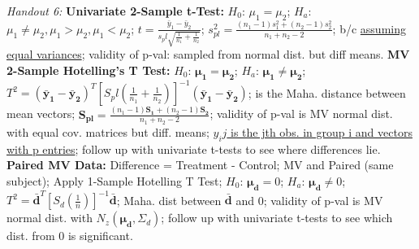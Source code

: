 \documentclass[9pt]{extarticle}
\begin{document}
\textit{Handout 6:}
\textbf{Univariate 2-Sample t-Test:} $H_0$: $\mu_1 = \mu_2$; $H_a$: $\mu_1 
\neq \mu_2, \mu_1 > \mu_2, \mu_1 < \mu_2$; $t = \frac{\bar{y}_1 - \bar{y}_2}
{s_pl\sqrt{\frac{1}{n_1} + \frac{1}{n_2}}}$; $s_{pl}^2 = \frac{(n_1 - 1)s_1^2
+ (n_2 - 1)s_2^2}{n_1 + n_2 - 2}$; b/c \underline{assuming equal variances}; 
validity of p-val: sampled from normal dist. but diff means.
\textbf{MV 2-Sample Hotelling's T Test:} $H_0$: $\boldsymbol{\mu_1} =
\boldsymbol{\mu_2}$; $H_a$: $\boldsymbol{\mu_1} \neq \boldsymbol{\mu_2}$; $T^2 
= (\boldsymbol{\bar{y}_1} - \boldsymbol{\bar{y}_2})^T[S_pl(\frac{1}{n_1} +
\frac{1}{n_2})]^{-1}(\boldsymbol{\bar{y}_1} - \boldsymbol{\bar{y}_2})$; is the 
Maha. distance between mean vectors; $\boldsymbol{S_{pl}} = \frac{(n_1 - 1)
\boldsymbol{S_1} + (n_2 - 1)\boldsymbol{S_2}}{n_1 + n_2 - 2}$; validity of p-val 
is MV normal dist. with equal cov. matrices but diff. means; \underline{$y_ij$ 
is the jth obs. in group i and vectors with p entries}; follow up with univariate
t-tests to see where differences lie.
\textbf{Paired MV Data:} Difference = Treatment - Control; MV and Paired (same
subject); Apply 1-Sample Hotelling T Test; $H_0$: $\boldsymbol{\mu_d} = 0$; 
$H_a$: $\boldsymbol{\mu_d} \neq 0$; $T^2 = 
\boldsymbol{\bar{d}}^T[S_{d}(\frac{1}{n})]^{-1}\boldsymbol{\bar{d}}$; Maha. dist 
between $\boldsymbol{\bar{d}}$ and 0; validity of p-val is MV normal dist. with
$N_z(\boldsymbol{\mu_d}, \Sigma_d)$; follow up with univariate t-tests to see
which dist. from 0 is significant.\\
\end{document}
